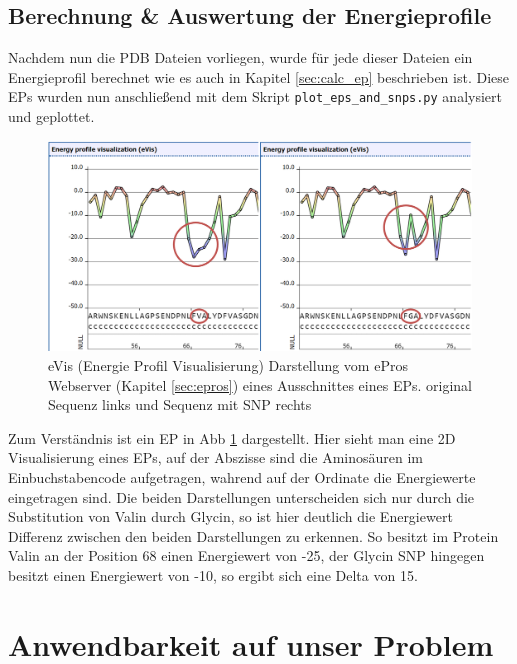 \subsection{Berechnung \& Auswertung der Energieprofile}
Nachdem nun die \ac{PDB} Dateien vorliegen, wurde für jede dieser Dateien ein Energieprofil berechnet wie es auch in Kapitel \ref{sec:calc_ep} beschrieben ist. Diese \ac{EPs} wurden nun anschließend mit dem Skript \texttt{plot\_eps\_and\_snps.py} analysiert und geplottet. 
%
\begin{figure}
    \centering
    \includegraphics[width=.99\textwidth]{images/ep_vs_snp.png}
    \caption{eVis (Energie Profil Visualisierung) Darstellung vom ePros Webserver (Kapitel \ref{sec:epros}) eines Ausschnittes eines \ac{EP}s. original Sequenz links und Sequenz mit \ac{SNP} rechts}
    \label{fig:ep_vs_snp}
\end{figure}

Zum Verständnis ist ein \ac{EP} in \ac{Abb} \ref{fig:ep_vs_snp} dargestellt. Hier sieht man eine 2D Visualisierung eines \ac{EP}s, auf der Abszisse sind die Aminosäuren im Einbuchstabencode aufgetragen, wahrend auf der Ordinate die Energiewerte eingetragen sind. Die beiden Darstellungen unterscheiden sich nur durch die Substitution von Valin durch Glycin, so ist hier deutlich die Energiewert Differenz zwischen den beiden Darstellungen zu erkennen. So besitzt im Protein Valin an der Position 68 einen Energiewert von -25, der Glycin \ac{SNP} hingegen besitzt einen Energiewert von -10, so ergibt sich eine Delta von 15.





\newpage
\section{Anwendbarkeit auf unser Problem}



